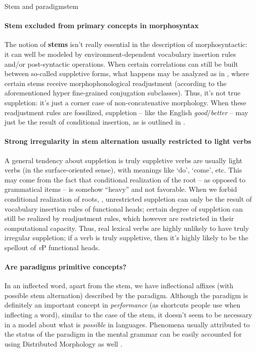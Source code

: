 \documentclass[a4paper, oneside]{report}
\newcommand*{\concept}[1]{\textbf{#1}}
\newcommand{\form}[1]{\emph{#1}}
\newcommand{\translate}[1]{`#1'}
\newcommand{\vP}{\textit{v}P}
\begin{document}
\begin{theorybox}{Stem and paradigm}{stem}
    \paragraph*{Stem excluded from primary concepts in morphosyntax} 
    The notion of \concept{stems} isn't really essential in the description of morphosyntactic:
    it can well be modeled by environment-dependent vocabulary insertion rules 
    and/or post-syntactic operations.
    When certain correlations can still be built between so-called suppletive forms,
    what happens may be analyzed as in \citet{embick2005status},
    where certain stems receive morphophonological readjustment
    (according to the aforementioned hyper fine-grained conjugation subclasses).
    Thus, it's not true suppletion:
    it's just a corner case of non-concatenative morphology.
    When these readjustment rules are fossilized,
    suppletion -- like the English \form{good}/\form{better} -- 
    may just be the result of conditional insertion,
    as is outlined in \citet{siddiqi2009syntax}.

    \paragraph*{Strong irregularity in stem alternation usually restricted to light verbs} 
    A general tendency about suppletion
    is truly suppletive verbs are usually light verbs 
    (in the surface-oriented sense),
    with meanings like \translate{do}, \translate{come}, etc.
    This may come from the fact that conditional realization of the root -- 
    as opposed to grammatical items --
    is somehow ``heavy'' and not favorable.
    When we forbid conditional realization of roots,
    \citep{embick2005status},
    unrestricted suppletion can only be the result of 
    vocabulary insertion rules of functional heads;
    certain degree of suppletion can still be realized by readjustment rules,
    which however are restricted in their computational capacity.
    Thus, real lexical verbs are highly unlikely to have truly irregular suppletion;
    if a verb is truly suppletive,
    then it's highly likely to be 
    the spellout of \vP{} functional heads.
    
    \paragraph*{Are paradigms primitive concepts?} 
    In an inflected word, apart from the stem, 
    we have inflectional affixes (with possible stem alternation) described by the paradigm.
    Although the paradigm is definitely an important concept 
    in \emph{performance} (as shortcuts people use when inflecting a word),
    similar to the case of the stem,
    it doesn't seem to be necessary 
    in a model about what is \emph{possible} in languages.
    Phenomena usually attributed to the status of the paradigm in 
    the mental grammar 
    can be easily accounted for using Distributed Morphology as well 
    \citep{embick2000features,bobaljik2002syncretism}.
\end{theorybox}
\end{document}
